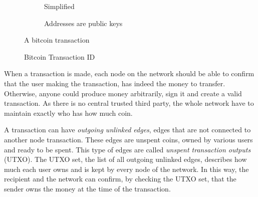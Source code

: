 \begin{figure}[!ht]
  \centering
  \begin{subfigure}[!ht]{\textwidth}
    \centering
    \caption{Simplified}
    \label{fig:bl_tx:simple}
    \vspace*{2mm}
  \end{subfigure}
  \begin{subfigure}[!ht]{\textwidth}
    \centering
    \caption{Addresses are public keys}
    \label{fig:bl_tx:pub}
    \vspace*{2mm}
  \end{subfigure}
  \caption{A bitcoin transaction}
  \label{fig:bl_tx:tx}
\end{figure}

\begin{figure}[!ht]
  \centering
  \caption{Bitcoin Transaction ID}
  \label{fig:bl_tx:id}
\end{figure}

When a transaction is made, each node on the network should be able to confirm that the user making the transaction, has indeed the money to transfer. Otherwise, anyone could produce money arbitrarily, sign it and create a valid transaction. As there is no central trusted third party, the whole network have to maintain exactly who has how much coin.

A transaction can have \textit{outgoing unlinked edges}, edges that are not connected to another node transaction. These edges are unspent coins, owned by various users and ready to be spent. This type of edges are called \textit{unspent transaction outputs} (UTXO). The UTXO set, the list of all outgoing unlinked edges, describes how much each user owns and is kept by every node of the network. In this way, the recipient and the network can confirm, by checking the UTXO set, that the sender owns the money at the time of the transaction.

